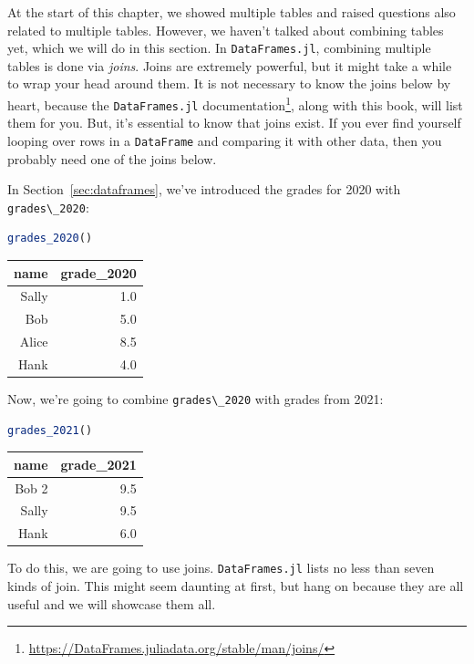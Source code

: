 \documentclass[
  notoc %
]{tufte-book}
\DeclareRobustCommand{\href}[2]{#2\footnote{\url{#1}}}
\newcommand{\passthrough}[1]{#1}
\begin{document}
At the start of this chapter, we showed multiple tables and raised
questions also related to multiple tables. However, we haven't talked
about combining tables yet, which we will do in this section. In
\passthrough{\lstinline!DataFrames.jl!}, combining multiple tables is
done via \emph{joins}. Joins are extremely powerful, but it might take a
while to wrap your head around them. It is not necessary to know the
joins below by heart, because the
\href{https://DataFrames.juliadata.org/stable/man/joins/}{\passthrough{\lstinline!DataFrames.jl!}
documentation}, along with this book, will list them for you. But, it's
essential to know that joins exist. If you ever find yourself looping
over rows in a \passthrough{\lstinline!DataFrame!} and comparing it with
other data, then you probably need one of the joins below.

In Section~\ref{sec:dataframes}, we've introduced the grades for 2020
with \passthrough{\lstinline!grades\_2020!}:

\begin{lstlisting}[language=Julia]
grades_2020()
\end{lstlisting}

\begin{longtable}[]{@{}rr@{}}
\toprule
name & grade\_2020 \\
\midrule
\endhead
Sally & 1.0 \\
Bob & 5.0 \\
Alice & 8.5 \\
Hank & 4.0 \\
\bottomrule
\end{longtable}

Now, we're going to combine \passthrough{\lstinline!grades\_2020!} with
grades from 2021:

\begin{lstlisting}[language=Julia]
grades_2021()
\end{lstlisting}

\begin{longtable}[]{@{}rr@{}}
\toprule
name & grade\_2021 \\
\midrule
\endhead
Bob 2 & 9.5 \\
Sally & 9.5 \\
Hank & 6.0 \\
\bottomrule
\end{longtable}

To do this, we are going to use joins.
\passthrough{\lstinline!DataFrames.jl!} lists no less than seven kinds
of join. This might seem daunting at first, but hang on because they are
all useful and we will showcase them all.
\end{document}

